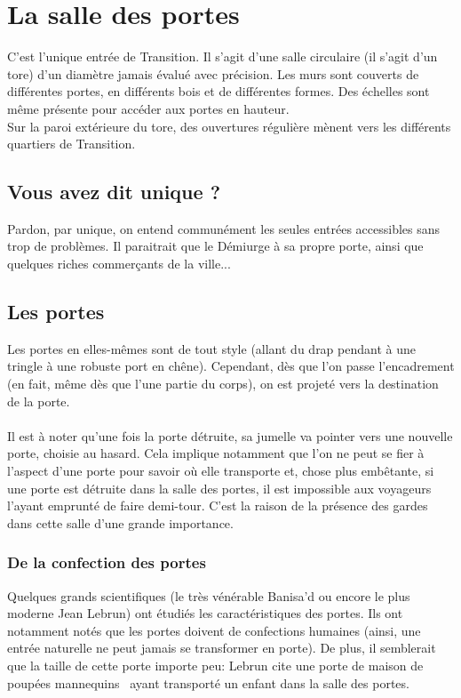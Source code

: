 \documentclass{book}
\begin{document}
\section{La salle des portes}

C'est l'unique entrée de Transition. Il s'agit d'une salle circulaire (il s'agit d'un tore) d'un diamètre jamais évalué avec précision. Les murs sont couverts de différentes portes, en différents bois et de différentes formes. Des échelles sont même présente pour accéder aux portes en hauteur.\\
Sur la paroi extérieure du tore, des ouvertures régulière mènent vers les différents quartiers de Transition.

\subsection{Vous avez dit unique ?}
Pardon, par unique, on entend communément les seules entrées accessibles sans trop de problèmes. Il paraitrait que le Démiurge à sa propre porte, ainsi que quelques riches commerçants de la ville...

\subsection{Les portes}
Les portes en elles-mêmes sont de tout style (allant du drap pendant à une tringle à une robuste port en chêne). Cependant, dès que l'on passe l'encadrement (en fait, même dès que l'une partie du corps), on est projeté vers la destination de la porte.
\\
\\
Il est à noter qu'une fois la porte détruite, sa jumelle va pointer vers une nouvelle porte, choisie au hasard. Cela implique notamment que l'on ne peut se fier à l'aspect d'une porte pour savoir où elle transporte et, chose plus embêtante, si une porte est détruite dans la salle des portes, il est impossible aux voyageurs l'ayant emprunté de faire demi-tour. C'est la raison de la présence des gardes dans cette salle d'une grande importance.

\subsubsection{De la confection des portes}
Quelques grands scientifiques (le très vénérable Banisa'd ou encore le plus moderne Jean Lebrun) ont étudiés les caractéristiques des portes. Ils ont notamment notés que les portes doivent de confections humaines (ainsi, une entrée naturelle ne peut jamais se transformer en porte). De plus, il semblerait que la taille de cette porte importe peu: Lebrun cite une \guillemotleft porte de maison de poupées mannequins \guillemotright \ ayant transporté un enfant dans la salle des portes.
\end{document}
